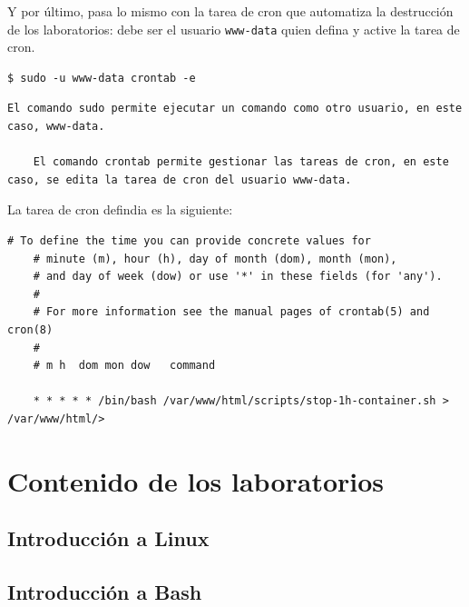         Y por último, pasa lo mismo con la tarea de cron que automatiza la destrucción de los laboratorios: debe ser el usuario \texttt{www-data} quien defina y active la tarea de cron.
        \\

        \begin{lstlisting}[style=bash_style]
    $ sudo -u www-data crontab -e
        \end{lstlisting}

        \begin{lstlisting}[style=comment_style]
    El comando sudo permite ejecutar un comando como otro usuario, en este caso, www-data.

    El comando crontab permite gestionar las tareas de cron, en este caso, se edita la tarea de cron del usuario www-data.
        \end{lstlisting}

        La tarea de cron defindia es la siguiente:
        \\

        \begin{lstlisting}[style=bash_style, caption={contenido del fichero},captionpos=b, basicstyle=\ttfamily\scriptsize]
    # To define the time you can provide concrete values for
    # minute (m), hour (h), day of month (dom), month (mon),
    # and day of week (dow) or use '*' in these fields (for 'any').
    # 
    # For more information see the manual pages of crontab(5) and cron(8)
    # 
    # m h  dom mon dow   command

    * * * * * /bin/bash /var/www/html/scripts/stop-1h-container.sh > /var/www/html/>
        \end{lstlisting}

        \cleardoublepage



\chapter{Contenido de los laboratorios}

    \section{Introducción a Linux}
    
    \section{Introducción a Bash}

